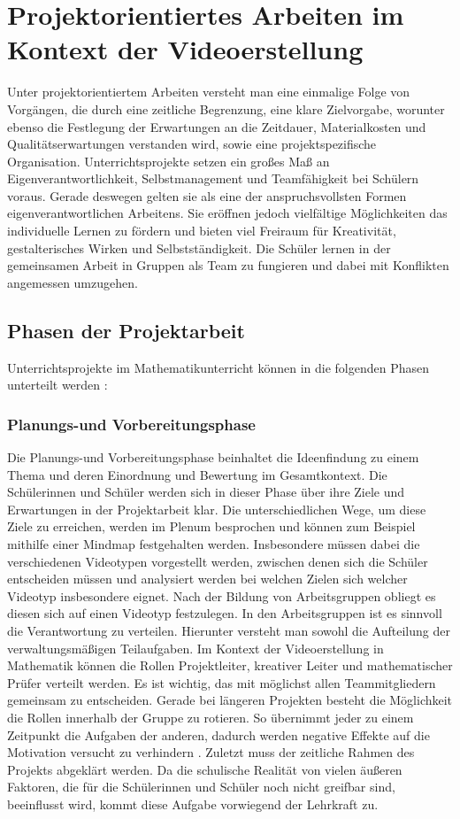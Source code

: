 \documentclass[a4paper,12pt,twoside=false]{scrartcl}
\begin{document}
\section{Projektorientiertes Arbeiten im Kontext der Videoerstellung}
Unter projektorientiertem Arbeiten versteht man eine einmalige Folge von Vorgängen, die durch eine zeitliche Begrenzung, eine klare Zielvorgabe, worunter ebenso die Festlegung der Erwartungen an die Zeitdauer, Materialkosten und Qualitätserwartungen verstanden wird, sowie eine projektspezifische Organisation. Unterrichtsprojekte setzen ein großes Maß an Eigenverantwortlichkeit, Selbstmanagement und Teamfähigkeit bei Schülern voraus. Gerade deswegen gelten sie als eine der anspruchsvollsten Formen eigenverantwortlichen Arbeitens. Sie eröffnen jedoch vielfältige Möglichkeiten das individuelle Lernen zu fördern und bieten viel Freiraum für Kreativität, gestalterisches Wirken und Selbstständigkeit. Die Schüler lernen in der gemeinsamen Arbeit in Gruppen als Team zu fungieren und dabei mit Konflikten angemessen umzugehen. 

\subsection{Phasen der Projektarbeit}
Unterrichtsprojekte im Mathematikunterricht können in die folgenden Phasen unterteilt werden \cite{IndividuelleLernwege}: \\
\subsubsection{Planungs-und Vorbereitungsphase}\label{Vorbereitungsphase}
Die Planungs-und Vorbereitungsphase beinhaltet die Ideenfindung zu einem Thema und deren Einordnung und Bewertung im Gesamtkontext. Die Schülerinnen und Schüler werden sich in dieser Phase über ihre Ziele und Erwartungen in der Projektarbeit klar. Die unterschiedlichen Wege, um diese Ziele zu erreichen, werden im Plenum besprochen und können zum Beispiel mithilfe einer Mindmap festgehalten werden. Insbesondere müssen dabei die verschiedenen Videotypen vorgestellt werden, zwischen denen sich die Schüler entscheiden müssen und analysiert werden bei welchen Zielen sich welcher Videotyp insbesondere eignet.  Nach der Bildung von Arbeitsgruppen obliegt es diesen sich auf einen Videotyp festzulegen. In den Arbeitsgruppen ist es sinnvoll die Verantwortung zu verteilen. Hierunter versteht man sowohl die Aufteilung der verwaltungsmäßigen Teilaufgaben. Im Kontext der Videoerstellung in Mathematik können die Rollen Projektleiter, kreativer Leiter und mathematischer Prüfer verteilt werden. Es ist wichtig, das mit möglichst allen Teammitgliedern gemeinsam zu entscheiden. Gerade bei längeren Projekten besteht die Möglichkeit die Rollen innerhalb der Gruppe zu rotieren. So übernimmt jeder zu einem Zeitpunkt die Aufgaben der anderen, dadurch werden negative Effekte auf die Motivation versucht zu verhindern \label{VerteilungVerantwortung}. \cite{ISB05}
Zuletzt muss der zeitliche Rahmen des Projekts abgeklärt werden. Da die schulische Realität von vielen äußeren Faktoren, die für die Schülerinnen und Schüler noch nicht greifbar sind, beeinflusst wird, kommt diese Aufgabe vorwiegend der Lehrkraft zu.
\end{document}
